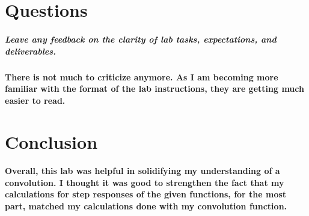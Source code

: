 \documentclass[12pt,a4paper]{article}
\begin{document}
\section{Questions}\label{sec:res}

\subparagraph{\large Leave any feedback on the clarity of lab tasks, expectations, and deliverables.}

\paragraph{There is not much to criticize anymore. As I am becoming more familiar with the format of the lab instructions, they are getting much easier to read.}

\section{Conclusion}\label{sec:res}

\paragraph{Overall, this lab was helpful in solidifying my understanding of a convolution. I thought it was good to strengthen the fact that my calculations for step responses of the given functions, for the most part, matched my calculations done with my convolution function. }





\end{document}
